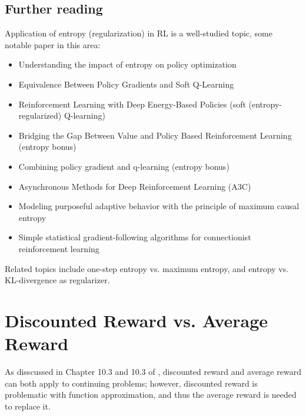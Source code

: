 \documentclass[lang=en,mode=normal,device=normal,color=blue,12pt]{elegantnote}
\DeclareMathOperator*{\1}{\mathbbm{1}}
\begin{document}
\begin{appendices}
\subsection{Further reading}

Application of entropy (regularization) in RL is a well-studied topic, some notable paper in this area:

\begin{itemize}
\item \cite{ahmed2019understanding} Understanding the impact of entropy on policy optimization
\item \cite{schulman2018equivalence} Equivalence Between Policy Gradients and Soft Q-Learning
\item \cite{haarnoja2017reinforcement} Reinforcement Learning with Deep Energy-Based Policies (soft (entropy-regularized) Q-learning)
\item \cite{nachum2017bridging} Bridging the Gap Between Value and Policy Based Reinforcement Learning (entropy bonus)
\item \cite{odonoghue2017combining} Combining policy gradient and q-learning (entropy bonus)
\item \cite{mnih2016asynchronous} Asynchronous Methods for Deep Reinforcement Learning (A3C)
\item \cite{brianEntropy2010} Modeling purposeful adaptive behavior with the principle of maximum causal entropy
\item \cite{Williams1992SimpleSG} Simple statistical gradient-following algorithms for connectionist reinforcement learning
\end{itemize}

Related topics include one-step entropy vs. maximum entropy, and entropy vs. KL-divergence as regularizer.

\section{Discounted Reward vs. Average Reward}

As disscussed in Chapter 10.3 and 10.3 of \cite{Sutton1998}, discounted reward and average reward can both apply to continuing problems; however, discounted reward is problematic with function approximation, and thus the average reward is needed to replace it.


\end{appendices}
\end{document}
